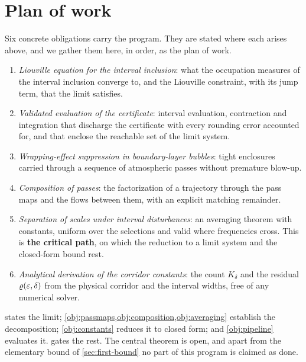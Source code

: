 \documentclass[english,11pt]{extarticle}
\begin{document}
\section{Plan of work}\label{sec:plan}
Six concrete obligations carry the program. They are stated where each
arises above, and we gather them here, in order, as the plan of work.
\begin{enumerate}[leftmargin=*,itemsep=2pt]
  \item \emph{Liouville equation for the interval inclusion}: what the
    occupation measures of the interval inclusion converge to, and the
    Liouville constraint, with its jump term, that the limit satisfies.
  \item \emph{Validated evaluation of the certificate}: interval evaluation,
    contraction and integration that discharge the certificate with every
    rounding error accounted for, and that enclose the reachable set of the
    limit system.
  \item \emph{Wrapping-effect suppression in boundary-layer bubbles}: tight
    enclosures carried through a sequence of atmospheric passes without
    premature blow-up.
  \item \emph{Composition of passes}: the factorization of a trajectory
    through the pass maps and the flows between them, with an explicit
    matching remainder.
  \item \emph{Separation of scales under interval disturbances}: an
    averaging theorem with constants, uniform over the selections and valid
    where frequencies cross. This is \textbf{the critical path}, on which
    the reduction to a limit system and the closed-form bound rest.
  \item \emph{Analytical derivation of the corridor constants}: the count
    $K_\delta$ and the residual $\varrho(\varepsilon,\delta)$ from the physical
    corridor and the interval widths, free of any numerical solver.
\end{enumerate}
 states the limit;
\cref{obj:passmaps,obj:composition,obj:averaging} establish the
decomposition; \cref{obj:constants} reduces it to closed form; and
\cref{obj:pipeline} evaluates it.
 gates the rest. The central theorem is open, and
apart from the elementary bound of \cref{sec:first-bound} no part of this
program is claimed as done.
\end{document}
